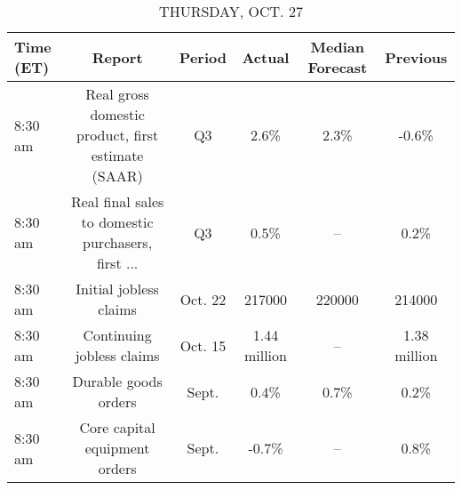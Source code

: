 \documentclass{article}%
\begin{document}
%


\begin{table}[htbp]%
\caption{THURSDAY, OCT. 27}%
\centering%
\begin{adjustbox}{width=1\textwidth}%
\begin{tabular}{lccccc}
\toprule
Time (ET) &                                             Report &  Period &       Actual & Median Forecast &     Previous \\
\midrule
  8:30 am & Real gross domestic product, first estimate (SAAR) &      Q3 &         2.6\% &            2.3\% &        -0.6\% \\
  8:30 am & Real final sales to domestic purchasers, first ... &      Q3 &         0.5\% &              -- &         0.2\% \\
  8:30 am &                             Initial jobless claims & Oct. 22 &       217000 &          220000 &       214000 \\
  8:30 am &                          Continuing jobless claims & Oct. 15 & 1.44 million &              -- & 1.38 million \\
  8:30 am &                               Durable goods orders &   Sept. &         0.4\% &            0.7\% &         0.2\% \\
  8:30 am &                      Core capital equipment orders &   Sept. &        -0.7\% &              -- &         0.8\% \\
\bottomrule
\end{tabular}
%
\end{adjustbox}%
\end{table}

%
\end{document}

